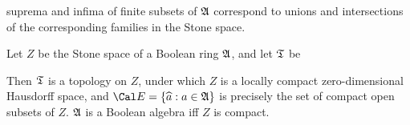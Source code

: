  
\noindent suprema and infima of finite subsets of $\frak A$ correspond to 
unions and intersections of the corresponding families in the Stone 
space.    
 
 Let $Z$ be the 
Stone space of a Boolean ring $\frak A$, and let $\frak T$ be 
 
 
\noindent Then $\frak T$ is a topology on $Z$, under which $Z$ 
is a locally compact zero-dimensional Hausdorff space, and 
$\Cal E=\{\widehat{a}:a\in\frak A\}$ is precisely the set 
of compact open subsets of $Z$.   $\frak A$ is a Boolean algebra iff $Z$ 
is compact. 
 
